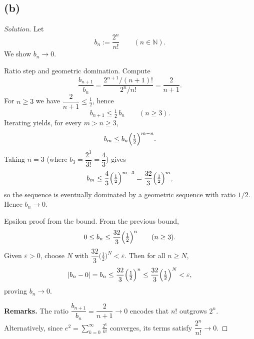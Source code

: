 \documentclass[12pt,a4paper]{article}
\theoremstyle{definition}
\theoremstyle{remark}
\newenvironment{solution}{\begin{proof}[Solution]}{\end{proof}}
\begin{document}
\subsection*{(b)}
\begin{solution}
Let
\[
b_n:=\frac{2^n}{n!}\qquad(n\in\mathbb{N}).
\]
We show $b_n\to 0$.

Ratio step and geometric domination. Compute
\[
\frac{b_{n+1}}{b_n}
=\frac{2^{n+1}/(n+1)!}{2^n/n!}
=\frac{2}{n+1}.
\]
For $n\ge 3$ we have $\dfrac{2}{n+1}\le \tfrac12$, hence
\[
b_{n+1}\le \tfrac12\,b_n\qquad(n\ge 3).
\]
Iterating yields, for every $m>n\ge 3$,
\[
b_m \le b_n\Bigl(\tfrac12\Bigr)^{m-n}.
\]
Taking $n=3$ (where $b_3=\dfrac{2^3}{3!}=\dfrac{4}{3}$) gives
\[
b_m \le \frac{4}{3}\Bigl(\tfrac12\Bigr)^{m-3}
= \frac{32}{3}\Bigl(\tfrac12\Bigr)^m,
\]
so the sequence is eventually dominated by a geometric sequence with ratio $1/2$. Hence $b_n\to 0$.

Epsilon proof from the bound. From the previous bound,
\[
0\le b_n \le \frac{32}{3}\Bigl(\tfrac12\Bigr)^n\qquad(n\ge 3).
\]
Given $\varepsilon>0$, choose $N$ with $\dfrac{32}{3}\bigl(\tfrac12\bigr)^N<\varepsilon$. Then for all $n\ge N$,
\[
|b_n-0|=b_n\le \frac{32}{3}\Bigl(\tfrac12\Bigr)^n\le \frac{32}{3}\Bigl(\tfrac12\Bigr)^N<\varepsilon,
\]
proving $b_n\to 0$.

\textbf{Remarks.} The ratio $\dfrac{b_{n+1}}{b_n}=\dfrac{2}{n+1}\to 0$ encodes that $n!$ outgrows $2^n$. Alternatively, since $e^2=\sum_{k=0}^\infty\frac{2^k}{k!}$ converges, its terms satisfy $\dfrac{2^n}{n!}\to 0$.
\end{solution}

\end{document}

